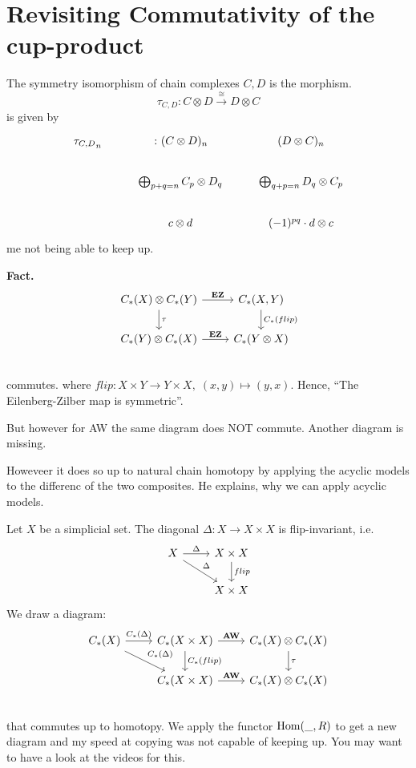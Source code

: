 \documentclass[language=english]{TemplateLecture}
\begin{document}
\section{Revisiting Commutativity of the cup-product}

The symmetry isomorphism of chain complexes \(C,D\) is the morphism.
\[\tau_{C,D} \colon C\otimes D \xrightarrow{\cong} D\otimes C\]
is given by
\[\begin{tikzcd}
    {\tau_{C,D}}_n & \colon (C\otimes D)_n & (D\otimes C)_n \\
    & \bigoplus_{p+q = n} C_p \otimes D_q & \bigoplus_{q+p= n} D_q \otimes C_p \\
    & c\otimes d & (-1)^{pq} \cdot d\otimes c
\end{tikzcd}\]
me not being able to keep up.

\textbf{Fact.}
\[\begin{tikzcd}
    C_*(X) \otimes C_*(Y) \ar[d, "\tau"] \ar[r, "\mathbf{EZ}"] & C_*(X,Y) \ar[d, "C_*(flip)"] \\
    C_*(Y) \otimes C_*(X) \ar[r, "\mathbf{EZ}"] & C_*(Y\otimes X) \\
\end{tikzcd}\]
commutes. where \(flip \colon X \times Y \to Y \times X, \; (x,y) \mapsto (y,x)\).
Hence, \enquote{The Eilenberg-Zilber map is symmetric}.

But however for AW the same diagram does NOT commute. Another diagram is missing.


Howeveer it does so up to natural chain homotopy by applying the acyclic models to the differenc of the two composites. He explains, why we can apply acyclic models.

Let \(X\) be a simplicial set. The diagonal \(\Delta\colon X \to X \times X\) is flip-invariant, i.e.
\[\begin{tikzcd}
    X \ar[r, "\Delta"]\ar[rd, "\Delta"] & X\times X \ar[d, "flip"] \\
    & X \times X
\end{tikzcd}\]
We draw a diagram:
\[\begin{tikzcd}
    C_*(X) \ar[r, "C_*(\Delta)"] \ar[rd, "C_*(\Delta)"] & C_*(X\times X) \ar[d, "C_*(flip)"]\ar[r, "\mathbf{AW}"] &C_*(X) \otimes C_*(X) \ar[d, "\tau"]\\
    & C_*(X\times X) \ar[r, "\mathbf{AW}"]& C_*(X) \otimes C_*(X) \\
\end{tikzcd}\]
that commutes up to homotopy. We apply the functor \(\operatorname{Hom}(\_, R)\) to get a new diagram and my speed at copying was not capable of keeping up. You may want to have a look at the videos for this.
\end{document}
